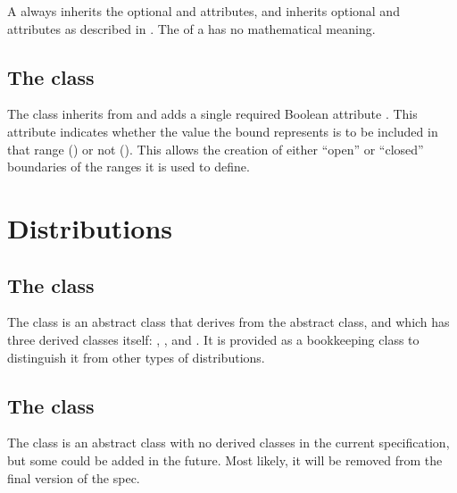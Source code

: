 A \Distribution always inherits the optional  and  attributes, and inherits optional  and  attributes as described in .  The  of a \Distribution has no mathematical meaning.


\subsection{The  class}
\label{UncertBound-class}
\label{uncertbound-class}

The \UncertBound class inherits from \UncertValue and adds a single required Boolean attribute .  This attribute indicates whether the value the bound represents is to be included in that range () or not ().  This allows the creation of either ``open'' or ``closed'' boundaries of the ranges it is used to define.





\section{Distributions}
\label{apdx-distributions}

\subsection{The  class}
\label{UnivariateDistribution-class}
\label{univariatedistribution-class}

The \UnivariateDistribution class is an abstract class that derives from the \Distribution abstract class, and which has three derived classes itself: \ContinuousUnivariateDistribution, \DiscreteUnivariateDistribution, and \CategoricalUnivariateDistribution.  It is provided as a bookkeeping class to distinguish it from other types of distributions.


\subsection{The  class}
\label{MultivariateDistribution-class}
\label{multivariatedistribution-class}

The \MultivariateDistribution class is an abstract class with no derived classes in the current specification, but some could be added in the future.  Most likely, it will be removed from the final version of the spec.


